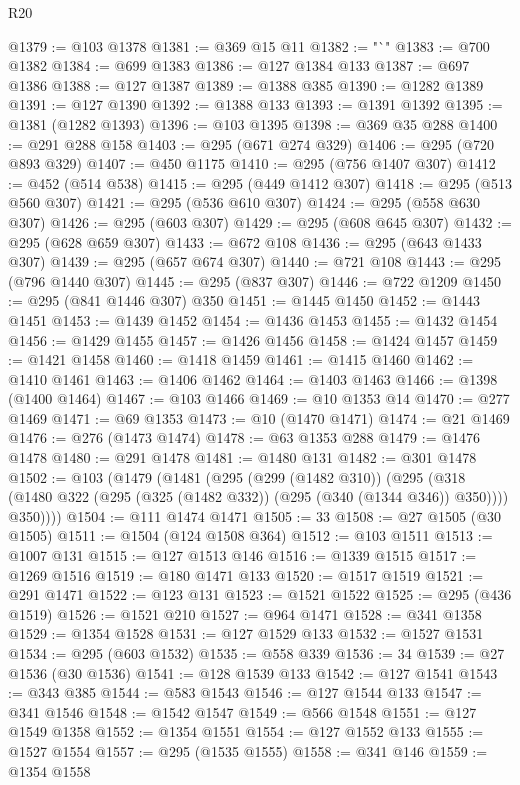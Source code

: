 \begin{lexlean}{R20}
\begin{coremodule}
{{{{{{{{{{{{{{{{{{{{{{{{{{{{{{{{{{{{{{{{{{{{{{{{{{{{{{{{{{{{{{{@1379 := @103 @1378
@1381 := @369 @15 @11
@1382 := "`"
@1383 := @700 @1382
@1384 := @699 @1383
@1386 := @127 @1384 @133
@1387 := @697 @1386
@1388 := @127 @1387
@1389 := @1388 @385
@1390 := @1282 @1389
@1391 := @127 @1390
@1392 := @1388 @133
@1393 := @1391 @1392
@1395 := @1381 (@1282 @1393)
@1396 := @103 @1395
@1398 := @369 @35 @288
@1400 := @291 @288 @158
@1403 := @295 (@671 @274 @329)
@1406 := @295 (@720 @893 @329)
@1407 := @450 @1175
@1410 := @295 (@756 @1407 @307)
@1412 := @452 (@514 @538)
@1415 := @295 (@449 @1412 @307)
@1418 := @295 (@513 @560 @307)
@1421 := @295 (@536 @610 @307)
@1424 := @295 (@558 @630 @307)
@1426 := @295 (@603 @307)
@1429 := @295 (@608 @645 @307)
@1432 := @295 (@628 @659 @307)
@1433 := @672 @108
@1436 := @295 (@643 @1433 @307)
@1439 := @295 (@657 @674 @307)
@1440 := @721 @108
@1443 := @295 (@796 @1440 @307)
@1445 := @295 (@837 @307)
@1446 := @722 @1209
@1450 := @295 (@841 @1446 @307) @350
@1451 := @1445 @1450
@1452 := @1443 @1451
@1453 := @1439 @1452
@1454 := @1436 @1453
@1455 := @1432 @1454
@1456 := @1429 @1455
@1457 := @1426 @1456
@1458 := @1424 @1457
@1459 := @1421 @1458
@1460 := @1418 @1459
@1461 := @1415 @1460
@1462 := @1410 @1461
@1463 := @1406 @1462
@1464 := @1403 @1463
@1466 := @1398 (@1400 @1464)
@1467 := @103 @1466
@1469 := @10 @1353 @14
@1470 := @277 @1469
@1471 := @69 @1353
@1473 := @10 (@1470 @1471)
@1474 := @21 @1469
@1476 := @276 (@1473 @1474)
@1478 := @63 @1353 @288
@1479 := @1476 @1478
@1480 := @291 @1478
@1481 := @1480 @131
@1482 := @301 @1478
@1502 := @103
    (@1479
      (@1481
        (@295
          (@299 (@1482 @310))
          (@295
            (@318 (@1480 @322 (@295 (@325 (@1482 @332)) (@295 (@340 (@1344 @346)) @350))))
            @350))))
@1504 := @111 @1474 @1471
@1505 := 33
@1508 := @27 @1505 (@30 @1505)
@1511 := @1504 (@124 @1508 @364)
@1512 := @103 @1511
@1513 := @1007 @131
@1515 := @127 @1513 @146
@1516 := @1339 @1515
@1517 := @1269 @1516
@1519 := @180 @1471 @133
@1520 := @1517 @1519
@1521 := @291 @1471
@1522 := @123 @131
@1523 := @1521 @1522
@1525 := @295 (@436 @1519)
@1526 := @1521 @210
@1527 := @964 @1471
@1528 := @341 @1358
@1529 := @1354 @1528
@1531 := @127 @1529 @133
@1532 := @1527 @1531
@1534 := @295 (@603 @1532)
@1535 := @558 @339
@1536 := 34
@1539 := @27 @1536 (@30 @1536)
@1541 := @128 @1539 @133
@1542 := @127 @1541
@1543 := @343 @385
@1544 := @583 @1543
@1546 := @127 @1544 @133
@1547 := @341 @1546
@1548 := @1542 @1547
@1549 := @566 @1548
@1551 := @127 @1549 @1358
@1552 := @1354 @1551
@1554 := @127 @1552 @133
@1555 := @1527 @1554
@1557 := @295 (@1535 @1555)
@1558 := @341 @146
@1559 := @1354 @1558
}}}}}}}}}}}}}}}}}}}}}}}}}}}}}}}}}}}}}}}}}}}}}}}}}}}}}}}}}}}}}}}
\end{coremodule}
\end{lexlean}
